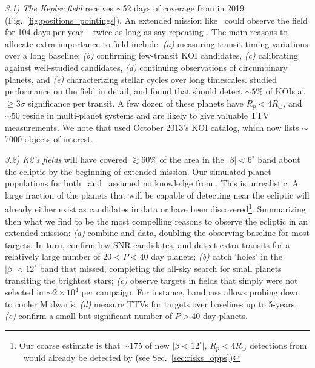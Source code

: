 \textit{3.1) The Kepler field} receives $\sim$52 days of coverage from \tess in 2019 (Fig.~\ref{fig:positions_pointings}).
An extended mission like \npole\ could observe the field for 104 days per year -- twice as long as say repeating \nhemi.
The main reasons to allocate extra importance to \keplers field include:
\textit{(a)} measuring transit timing variations over a long baseline;
\textit{(b)} confirming few-transit KOI candidates, 
\textit{(c)} calibrating \tess against well-studied candidates,
\textit{(d)} continuing observations of circumbinary planets, and
\textit{(e)} characterizing stellar cycles over long timescales. %
\citet{sullivan_KOIs_2013} studied \tesss performance on the field in detail, and found that \tess %
should detect $\sim\!5\%$ of KOIs at $\geq\!3\sigma$ significance per transit.
A few dozen of these planets have $R_p<4R_\oplus$, and $\sim$50 reside in multi-planet systems and are likely to give valuable TTV measurements.
We note that \citet{sullivan_KOIs_2013} used October 2013's KOI catalog, which now lists $\sim$7000 objects of interest.

\textit{3.2) K2's fields} will have covered $\gtrsim\!60\%$ of the area in the $|\beta|<6^\circ$ band about the ecliptic by the beginning of \tesss extended mission.
Our simulated planet populations for both \elong\ and \eshort\ assumed no knowledge from \ktwo\!.
This is unrealistic.
A large fraction of the planets that \tess will be capable of detecting near the ecliptic will already either exist as candidates in \ktwos data or have been discovered\footnote{Our coarse estimate is that $\sim$175 of  new $|\beta<12^\circ|$, $R_p<4R_\oplus$ detections from \elong\ would already be detected by \ktwo (see Sec.~\protect\ref{sec:risks_opps})}.
Summarizing then what we find to be the most compelling reasons to observe the ecliptic in an extended \tess mission:
\textit{(a)} combine \tess and \ktwo data, doubling the \ktwo observing baseline for most targets. In turn, confirm low-SNR candidates, and detect extra transits for a relatively large number of $20<P<40$ day planets;
\textit{(b)} catch `holes' in the $|\beta| < 12^\circ$ band that \ktwo missed, completing the all-sky search for small planets transiting the brightest stars;
\textit{(c)} observe targets in \ktwo fields that simply were not selected in \ktwos $\sim\!2\times10^4$ per campaign. For instance, \tesss bandpass allows probing down to cooler M dwarfs;
\textit{(d)} measure TTVs for targets over baselines up to 5-years.
\textit{(e)} confirm a small but significant number of $P>40$ day planets.

